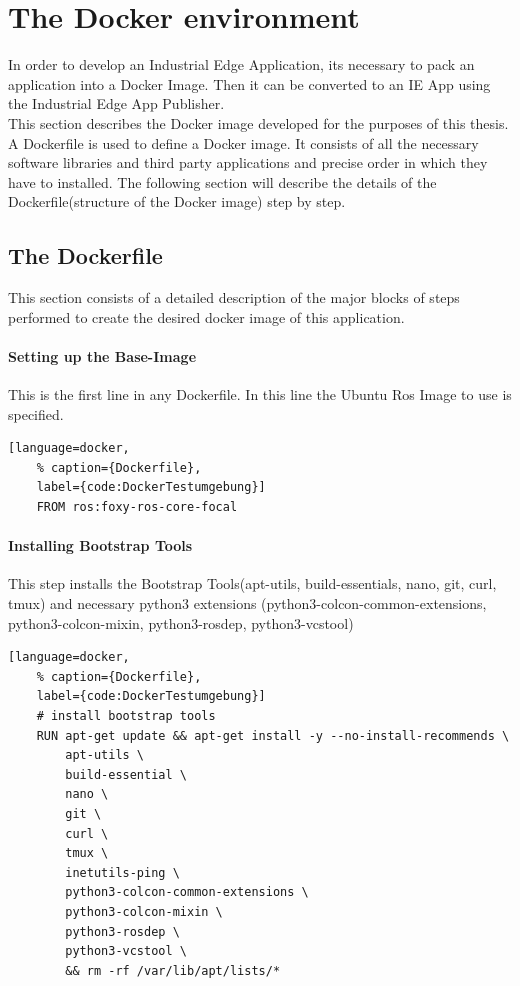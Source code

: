 \section{The Docker environment}
\label{Implementierung:DockerEnvironment}
In order to develop an Industrial Edge Application, its necessary to pack an application into a Docker Image. Then it can be converted to an IE App using the Industrial Edge App Publisher.\\

This section describes the Docker image developed for the purposes of this thesis. A Dockerfile is used to define a Docker image. It consists of all the necessary software libraries and third party applications and precise order in which they have to installed. The following section will describe the details of the Dockerfile(structure of the Docker image) step by step.
\subsection{The Dockerfile}
This section consists of a detailed description of the major blocks of steps performed to create the desired docker image of this application.
\paragraph{Setting up the Base-Image} This is the first line in any Dockerfile. In this line the Ubuntu Ros Image to use is specified.
\begin{lstlisting}[language=docker,
	% caption={Dockerfile}, 
	label={code:DockerTestumgebung}]
	FROM ros:foxy-ros-core-focal
\end{lstlisting}


\paragraph{Installing Bootstrap Tools} This step installs the Bootstrap Tools(apt-utils, build-essentials, nano, git, curl, tmux) and necessary python3 extensions (python3-colcon-common-extensions, python3-colcon-mixin, python3-rosdep, python3-vcstool)

\begin{lstlisting}[language=docker,
	% caption={Dockerfile}, 
	label={code:DockerTestumgebung}]
	# install bootstrap tools
	RUN apt-get update && apt-get install -y --no-install-recommends \
		apt-utils \
		build-essential \
		nano \
		git \
		curl \
		tmux \
		inetutils-ping \
		python3-colcon-common-extensions \
		python3-colcon-mixin \
		python3-rosdep \
		python3-vcstool \
		&& rm -rf /var/lib/apt/lists/*

\end{lstlisting}

